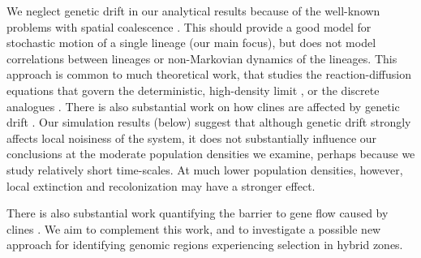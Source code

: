 \documentclass[11pt,letterpaper]{article}
\newcommand{\alisa}[1]{{\em \color{red} #1}}
\newcommand{\plr}[1]{{\em \color{blue} #1}}
\begin{document}
We neglect genetic drift in our analytical results 
because of the well-known problems with spatial coalescence \citep{felsenstein1975pain,barton2002continuous}.
This should provide a good model for stochastic motion of a single lineage (our main focus),
but does not model correlations between lineages or non-Markovian dynamics of the lineages.
This approach is common to much theoretical work,
that studies the reaction-diffusion equations that govern the deterministic, high-density limit \citep[as in][]{Nagylaki1975},
or the discrete analogues \citep{hanson1966effects}. 
There is also substantial work on how clines are affected by genetic drift \citep{Slatkin1975,felsenstein1975genetic,Nagylaki1978,durrett2007width,barton2008effect,Polechova2011}.
Our simulation results (below) suggest that although genetic drift strongly affects local noisiness of the system,
it does not substantially influence our conclusions at the moderate population densities we examine,
perhaps because we study relatively short time-scales.
At much lower population densities, however, local extinction and recolonization may have a stronger effect. 

There is also substantial work
quantifying the barrier to gene flow caused by clines \citep{barton1979gene,barton1986effects,Barton2000}.
We aim to complement this work,
and to investigate a possible new approach for identifying genomic regions experiencing selection in hybrid zones.


\end{document}
